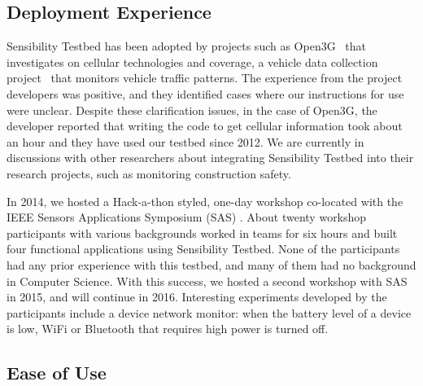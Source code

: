 \subsection{Deployment Experience}\label{sec-deployment}



Sensibility Testbed has been adopted by projects such as 
Open3G~\cite{open3g} that investigates on cellular technologies 
and coverage, a vehicle data collection project~\cite{reininger2015first} 
that monitors vehicle traffic patterns. The experience from the 
project developers was positive, and they identified cases where our 
instructions for use were unclear. Despite these clarification issues, in 
the case of Open3G, the developer reported that writing the code to
get cellular information took about an hour and they have used our
testbed since 2012. We are currently in discussions with other 
researchers about integrating Sensibility Testbed into their research
projects, such as monitoring construction safety.

In 2014, we hosted a Hack-a-thon styled, one-day workshop co-located with 
the IEEE Sensors Applications Symposium (SAS) \cite{sas}. About twenty 
workshop participants with various backgrounds worked in teams 
for six hours and built four functional applications using Sensibility 
Testbed. None of the participants had any prior experience with 
this testbed, and many of them had no background in Computer
Science. With this success, we hosted a second workshop with 
SAS in 2015, and will continue in 2016. Interesting experiments 
developed by the participants include a device network monitor: 
when the battery level of a device is low, WiFi or Bluetooth that 
requires high power is turned off.

\subsection{Ease of Use}\label{sec-ease}


